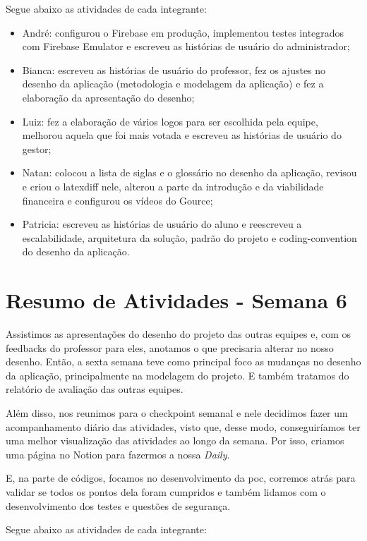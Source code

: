 \begin{apendicesenv}
Segue abaixo as atividades de cada integrante:

\begin{itemize}
\item André: configurou o Firebase em produção, implementou testes integrados com Firebase Emulator e escreveu as histórias de usuário do administrador;
\item Bianca: escreveu as histórias de usuário do professor, fez os ajustes no desenho da aplicação (metodologia e modelagem da aplicação) e fez a elaboração da apresentação do desenho;
\item Luiz: fez a elaboração de vários logos para ser escolhida pela equipe, melhorou aquela que foi mais votada e escreveu as histórias de usuário do gestor;
\item Natan: colocou a lista de siglas e o glossário no desenho da aplicação, revisou e criou o latexdiff nele, alterou a parte da introdução e da viabilidade financeira e configurou os vídeos do Gource;
\item Patricia: escreveu as histórias de usuário do aluno e reescreveu a escalabilidade, arquitetura da solução, padrão do projeto e \gls{coding-convention} do desenho da aplicação.
\end{itemize}

\section{Resumo de Atividades - Semana 6}
Assistimos as apresentações do desenho do projeto das outras equipes e, com os \glspl{feedback} do professor para eles, anotamos o que precisaria alterar no nosso desenho. Então, a sexta semana teve como principal foco as mudanças no desenho da aplicação, principalmente na modelagem do projeto. E também tratamos do relatório de avaliação das outras equipes.

Além disso, nos reunimos para o \gls{checkpoint} semanal e nele decidimos fazer um acompanhamento diário das atividades, visto que, desse modo, conseguiríamos ter uma melhor visualização das atividades ao longo da semana. Por isso, criamos uma página no Notion para fazermos a nossa \textit{Daily}.

E, na parte de códigos, focamos no desenvolvimento da \ac{poc}, corremos atrás para validar se todos os pontos dela foram cumpridos e também lidamos com o desenvolvimento dos testes e questões de segurança.

Segue abaixo as atividades de cada integrante:


\end{apendicesenv}
